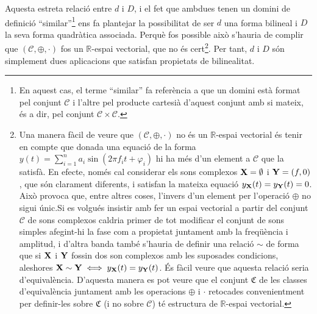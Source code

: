\documentclass{article}
\theoremstyle{math}
\theoremstyle{TheoremNum}
\newcommand{\0}{\ensuremath{\vb{0}}}
\newcommand{\X}{\ensuremath{\vb{X}}}
\newcommand{\Y}{\ensuremath{\vb{Y}}}
\newcommand{\RR}{\ensuremath{\mathbb{R}}} %
\begin{document}
Aquesta estreta relació entre $d$ i $D$, i el fet que ambdues tenen un domini de definició ``similar''\footnote{En aquest cas, el terme ``similar'' fa referència a que un domini està format pel conjunt $\mathcal{C}$ i l'altre pel producte cartesià d'aquest conjunt amb si mateix, és a dir, pel conjunt $\mathcal{C}\times\mathcal{C}$.} ens fa plantejar la possibilitat de ser $d$ una forma bilineal i $D$ la seva forma quadràtica associada. Perquè fos possible això s'hauria de complir que $(\mathcal{C},\oplus,\cdot)$ fos un $\RR$-espai vectorial, que no és cert\footnote{Una manera fàcil de veure que $(\mathcal{C},\oplus,\cdot)$ no és un $\RR$-espai vectorial és tenir en compte que donada una equació de la forma $y(t)=\sum_{i=1}^na_i\sin(2\pi f_it+\varphi_i)$ hi ha més d'un element a $\mathcal{C}$ que la satisfà. En efecte, només cal considerar els sons complexos $\X=\emptyset$ i $\Y=(f,0)$, que són clarament diferents, i satisfan la mateixa equació $y_{\X}(t)=y_{\Y}(t)=0$. Això provoca que, entre altres coses, l'invers d'un element per l'operació $\oplus$ no sigui únic.\newline Si es volgués insistir amb fer un espai vectorial a partir del conjunt $\mathcal{C}$ de sons complexos caldria primer de tot modificar el conjunt de sons simples afegint-hi la fase com a propietat juntament amb la freqüència i amplitud, i d'altra banda també s'hauria de definir una relació $\sim$ de forma que si $\X$ i $\Y$ fossin dos son complexos amb les suposades condicions, aleshores $\X\sim \Y\iff y_{\X}(t)=y_{\Y}(t)$. És fàcil veure que aquesta relació seria d'equivalència. D'aquesta manera es pot veure que el conjunt $\mathfrak{C}$ de les classes d'equivalència juntament amb les operacions $\oplus$ i $\cdot$ retocades convenientment per definir-les sobre $\mathfrak{C}$ (i no sobre $\mathcal{C}$) té estructura de $\RR$-espai vectorial.}. Per tant, $d$ i $D$ són simplement dues aplicacions que satisfan propietats de bilinealitat.
\end{document}
